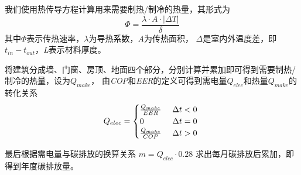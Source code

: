 \documentclass[a4paper, 12pt]{article}
\numberwithin{equation}{section}
\begin{document}
            我们使用热传导方程计算用来需要制热/制冷的热量，其形式为
            \begin{equation}
                \Phi = \frac{\lambda \cdot A \cdot |\Delta T|}{\delta}
            \end{equation}
            其中$ \Phi $表示传热速率，$ \lambda $为导热系数，\textit{A}为传热面积，
            $ \Delta $是室内外温度差，即$ t_{in} - t_{out} $，\textit{L}表示材料厚度。

            将建筑分成墙、门窗、房顶、地面四个部分，分别计算并累加即可得到需要制热/制冷的热量，设为$ Q_{make} $，
            由\textit{COP}和\textit{EER}的定义可得到需电量$ Q_{elec} $和热量$ Q_{make} $的转化关系
            \begin{equation}
                Q_{elec} =
                \begin{cases}
                    \frac{Q_{make}}{EER} & \text{ $ \Delta t < 0 $ } \\
                    0 & \text{ $ \Delta t = 0 $ } \\
                    \frac{Q_{make}}{COP} & \text{ $ \Delta t > 0 $ }
                \end{cases}
            \end{equation}

            最后根据需电量与碳排放的换算关系 $ m = Q_{elec} \cdot 0.28 $ 求出每月碳排放后累加，即得到年度碳排放量。


    {}


    {}


    {}


    {}


    {}
\end{document}
